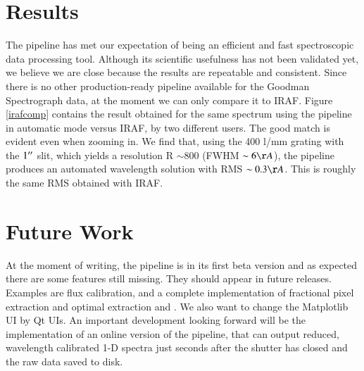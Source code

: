\documentclass[11pt,twoside]{article}
\begin{document}

\section{Results}
The pipeline has met our expectation of being an efficient and fast
spectroscopic data processing tool. Although its scientific usefulness has not
been validated yet, we believe we are close because the results are
repeatable and consistent. Since there is no other production-ready pipeline
available for the Goodman Spectrograph data, at the moment we can only compare it to
IRAF. Figure \ref{irafcomp} contains the result obtained for the same spectrum using
the pipeline in automatic mode versus IRAF, by two different users. The good
match is evident even when zooming in.
We find that, using the 400 l/mm grating with the $1\hbox{$^{\prime\prime}$}$ slit, which yields
a resolution R $\sim 800$ (FWHM $\sim 6 \AA$), the pipeline produces an automated 
wavelength solution with RMS $\sim 0.3 \AA$. This is roughly the same RMS obtained
with IRAF.




\section{Future Work}

At the moment of writing, the pipeline is in its first beta version and as
expected there are some features still missing. They should appear in future
releases. Examples are flux calibration, and a complete implementation of fractional pixel
extraction and optimal extraction \citep{1989PASP..101.1032M} and \citep{1986PASP...98..609H}.
We also want to change the Matplotlib UI by Qt UIs.
An important development looking forward will be the implementation of an online
version of the pipeline, that can output reduced, wavelength calibrated 1-D
spectra just seconds after the shutter has closed and the raw data saved to
disk.
\end{document}
